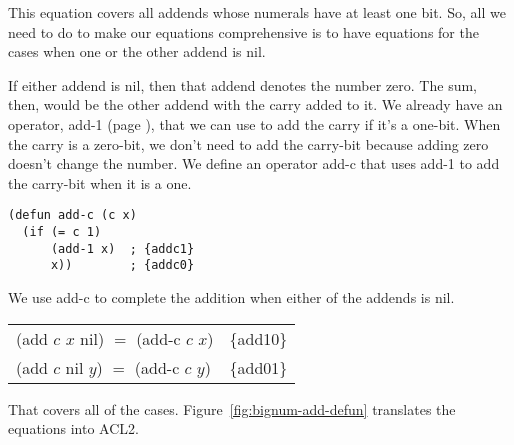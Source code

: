 This equation covers all addends whose numerals have at least one bit.
So, all we need to do to make our equations comprehensive
is to have equations for the cases when one or the other addend is \textsf{nil}.

If either addend is \textsf{nil},
then that addend denotes the number zero.
The sum, then, would be the other addend with the carry added to it.
We already have an operator, \textsf{add-1} (page \pageref{add-1-defun}),
that we can use to add the carry if it's a one-bit.
When the carry is a zero-bit, we don't need to add the carry-bit
because adding zero doesn't change the number.
We define an operator \textsf{add-c}
that uses \textsf{add-1} to add the carry-bit
when it is a one.

\label{add-c-defun}
\begin{code}
\begin{verbatim}
(defun add-c (c x)
  (if (= c 1)
      (add-1 x)  ; {addc1}
      x))        ; {addc0}
\end{verbatim}
\end{code}

We use \textsf{add-c }to complete the addition when either of the addends is \textsf{nil}.
\begin{center}
\begin{tabular}{ll}
\textsf{(add $c$ $x$ nil)} $=$ \textsf{(add-c $c$ $x$)}   & \{add10\} \\
\textsf{(add $c$ nil $y$)} $=$ \textsf{(add-c $c$ $y$)}   & \{add01\} \\
\end{tabular}
\end{center}

That covers all of the cases.
Figure~\ref{fig:bignum-add-defun} %
translates the equations into ACL2.

